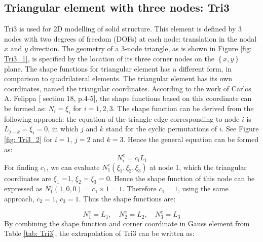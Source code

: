 \subsection{Triangular element with three nodes: Tri3}
Tri3 is used for 2D modelling of solid structure. This element is defined by 3 nodes with two degrees of freedom (DOFs) at each node: translation in the nodal $x$ and $y$ direction. The geometry of a 3-node triangle, as is shown in Figure \ref{fig: Tri3_1}, is specified by the location of its three corner nodes on the $\left\{x, y\right\}$ plane. The shape functions for triangular element has a different form, in comparison to quadrilateral elements. The triangular element has its own coordinates, named the triangular coordinates. According to the work of Carlos A. Felippa [\cite{Felippa} section 18, p.4-5], the shape functions based on this coordinate can be formed as: $N_i = \xi_i$ for $i = 1, 2, 3.$ The shape function can be derived from the following approach: the equation of the triangle edge corresponding to node $i$ is $L_{j-k} = \xi_i = 0$, in which $j$ and $k$ stand for the cyclic permutations of $i$. See Figure \ref{fig: Tri3_2} for $i = 1$, $j=2$ and $k = 3$. Hence the general equation can be formed as:
\begin{equation}
N_i^e = c_iL_i
\end{equation}
For finding $c_1$, we can evaluate $N_1^e\left(\xi_1, \xi_2, \xi_3\right)$ at node 1, which the triangular coordinates are $\xi_1$ =1, $\xi_2 = \xi_3 = 0$.  Hence the shape function of this node can be expressed as $N_1^e\left(1,0,0\right) = c_1 \times 1 = 1$. Therefore $c_1 = 1$, using the same approach, $c_2 = 1$, $c_3 = 1$. Thus the shape functions are:

\begin{equation}
N_1^e = L_1 , \quad N_2^e = L_2, \quad N_3^e = L_3
\end{equation}
By combining the shape function and corner coordinate in Gauss element from Table \ref{tab: Tri3}, the extrapolation of Tri3 can be written as:

